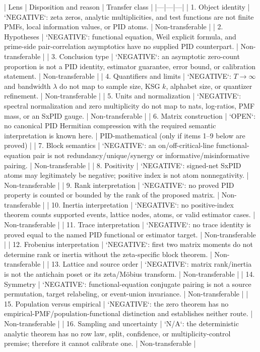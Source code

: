 \documentclass[11pt]{article}
\begin{document}
\begin{markdown}
| Lens | Disposition and reason | Transfer class |
|---|---|---|
| 1. Object identity | `NEGATIVE`: zeta zeros, analytic multiplicities, and test functions are not finite PMFs, local information values, or PID atoms. | Non-transferable |
| 2. Hypotheses | `NEGATIVE`: functional equation, Weil explicit formula, and prime-side pair-correlation asymptotics have no supplied PID counterpart. | Non-transferable |
| 3. Conclusion type | `NEGATIVE`: an asymptotic zero-count proportion is not a PID identity, estimator guarantee, error bound, or calibration statement. | Non-transferable |
| 4. Quantifiers and limits | `NEGATIVE`: $T\to\infty$ and bandwidth $\lambda$ do not map to sample size, KSG $k$, alphabet size, or quantizer refinement. | Non-transferable |
| 5. Units and normalization | `NEGATIVE`: spectral normalization and zero multiplicity do not map to nats, log-ratios, PMF mass, or an SxPID gauge. | Non-transferable |
| 6. Matrix construction | `OPEN`: no canonical PID Hermitian compression with the required semantic interpretation is known here. | PID-mathematical (only if items 1--9 below are proved) |
| 7. Block semantics | `NEGATIVE`: an on/off-critical-line functional-equation pair is not redundancy/unique/synergy or informative/misinformative pairing. | Non-transferable |
| 8. Positivity | `NEGATIVE`: signed-net SxPID atoms may legitimately be negative; positive index is not atom nonnegativity. | Non-transferable |
| 9. Rank interpretation | `NEGATIVE`: no proved PID property is counted or bounded by the rank of the proposed matrix. | Non-transferable |
| 10. Inertia interpretation | `NEGATIVE`: no positive-index theorem counts supported events, lattice nodes, atoms, or valid estimator cases. | Non-transferable |
| 11. Trace interpretation | `NEGATIVE`: no trace identity is proved equal to the named PID functional or estimator target. | Non-transferable |
| 12. Frobenius interpretation | `NEGATIVE`: first two matrix moments do not determine rank or inertia without the zeta-specific block theorem. | Non-transferable |
| 13. Lattice and source order | `NEGATIVE`: matrix rank/inertia is not the antichain poset or its zeta/Möbius transform. | Non-transferable |
| 14. Symmetry | `NEGATIVE`: functional-equation conjugate pairing is not a source permutation, target relabeling, or event-union invariance. | Non-transferable |
| 15. Population versus empirical | `NEGATIVE`: the zero theorem has no empirical-PMF/population-functional distinction and establishes neither route. | Non-transferable |
| 16. Sampling and uncertainty | `N/A`: the deterministic analytic theorem has no row law, split, confidence, or multiplicity-control premise; therefore it cannot calibrate one. | Non-transferable |

\end{markdown}
\end{document}
